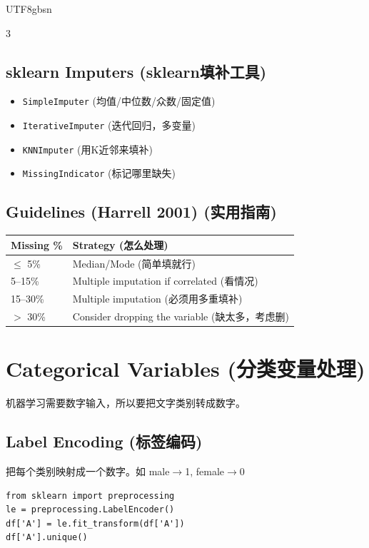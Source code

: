 \documentclass[10pt,landscape,a4paper]{article}
\newcommand{\zhint}[1]{{\scriptsize\color{gray!70!black}#1}}
\begin{document}
\begin{CJK}{UTF8}{gbsn}
\begin{multicols}{3}
\subsection{sklearn Imputers \zhint{(sklearn填补工具)}}
\begin{itemize}[leftmargin=*, nosep, itemsep=0pt]
    \item \texttt{SimpleImputer} \zhint{(均值/中位数/众数/固定值)}
    \item \texttt{IterativeImputer} \zhint{(迭代回归，多变量)}
    \item \texttt{KNNImputer} \zhint{(用K近邻来填补)}
    \item \texttt{MissingIndicator} \zhint{(标记哪里缺失)}
\end{itemize}

\subsection{Guidelines (Harrell 2001) \zhint{(实用指南)}}
\begin{center}
\scriptsize
\begin{tabular}{lp{4.5cm}}
\toprule
\textbf{Missing \%} & \textbf{Strategy} \zhint{(怎么处理)} \\
\midrule
$\leq$ 5\% & Median/Mode \zhint{(简单填就行)} \\
5--15\% & Multiple imputation if correlated \zhint{(看情况)} \\
15--30\% & Multiple imputation \zhint{(必须用多重填补)} \\
$>$ 30\% & Consider dropping the variable \zhint{(缺太多，考虑删)} \\
\bottomrule
\end{tabular}
\end{center}

\section{Categorical Variables \zhint{(分类变量处理)}}

\zhint{机器学习需要数字输入，所以要把文字类别转成数字。}

\subsection{Label Encoding \zhint{(标签编码)}}
\zhint{把每个类别映射成一个数字。如 male$\to$1, female$\to$0}
\begin{lstlisting}
from sklearn import preprocessing
le = preprocessing.LabelEncoder()
df['A'] = le.fit_transform(df['A'])
df['A'].unique()
\end{lstlisting}


\end{multicols}
\end{CJK}
\end{document}
